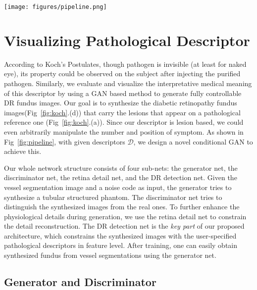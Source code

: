 \documentclass[letterpaper]{article} %
\begin{document}
	\begin{figure*}[h!]
		\begin{center}
			\texttt{[image: figures/pipeline.png]}
		\end{center}
		\caption{The architecture and data flow of our symptom transfer GAN, which contains four nets in training phase. After training, the generator itself is able to synthesize retinal fundus with lesions on specific locations.}
		\label{fig:pipeline}
	\end{figure*}

	\section{Visualizing Pathological Descriptor}

    According to Koch's Postulates, though pathogen is invisible (at least for naked eye), its property could be observed on the subject after injecting the purified pathogen. Similarly, we evaluate and visualize the interpretative medical meaning of this descriptor by using a GAN based method to generate fully controllable DR fundus images.  Our goal is to synthesize the diabetic retinopathy fundus images(Fig~\ref{fig:koch}.(d)) that carry the lesions that appear on a pathological reference one (Fig~\ref{fig:koch}.(a)). Since our descriptor is lesion based, we could even arbitrarily manipulate the number and position of symptom. As shown in Fig~\ref{fig:pipeline}, with given descriptors $ \mathcal{D} $, we design a novel conditional GAN to achieve this.

    Our whole network structure consists of four sub-nets: the generator net, the discriminator net, the retina detail net, and the DR detection net. Given the vessel segmentation image and a noise code as input, the generator tries to synthesize a tubular structured phantom. The discriminator net tries to distinguish the synthesized images from the real ones. To further enhance the physiological details during generation, we use the retina detail net to constrain the detail reconstruction. The DR detection net is the \emph{key part} of our proposed architecture, which constrains the synthesized images with the user-specified pathological descriptors in feature level. After training, one can easily obtain synthesized fundus from vessel segmentations using the generator net.







	\subsection{Generator and Discriminator}
\end{document}
